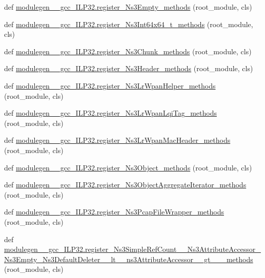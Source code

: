 \begin{DoxyCompactItemize}
\item 
def \hyperlink{namespacemodulegen____gcc__ILP32_aaaf5b4399b80410455abaa6263f1cd29}{modulegen\+\_\+\+\_\+gcc\+\_\+\+I\+L\+P32.\+register\+\_\+\+Ns3\+Empty\+\_\+methods} (root\+\_\+module, cls)
\item 
def \hyperlink{namespacemodulegen____gcc__ILP32_a162a098f5d929c52ad2e6c3ed1f54204}{modulegen\+\_\+\+\_\+gcc\+\_\+\+I\+L\+P32.\+register\+\_\+\+Ns3\+Int64x64\+\_\+t\+\_\+methods} (root\+\_\+module, cls)
\item 
def \hyperlink{namespacemodulegen____gcc__ILP32_acca0b09c03a65420f803907cd64df814}{modulegen\+\_\+\+\_\+gcc\+\_\+\+I\+L\+P32.\+register\+\_\+\+Ns3\+Chunk\+\_\+methods} (root\+\_\+module, cls)
\item 
def \hyperlink{namespacemodulegen____gcc__ILP32_aa49e4221854466e73c3442d993373495}{modulegen\+\_\+\+\_\+gcc\+\_\+\+I\+L\+P32.\+register\+\_\+\+Ns3\+Header\+\_\+methods} (root\+\_\+module, cls)
\item 
def \hyperlink{namespacemodulegen____gcc__ILP32_a968da64f4bbe9e3f6e46dfaf0edb7259}{modulegen\+\_\+\+\_\+gcc\+\_\+\+I\+L\+P32.\+register\+\_\+\+Ns3\+Lr\+Wpan\+Helper\+\_\+methods} (root\+\_\+module, cls)
\item 
def \hyperlink{namespacemodulegen____gcc__ILP32_a88bec2800cc13c4d4bd8350906877130}{modulegen\+\_\+\+\_\+gcc\+\_\+\+I\+L\+P32.\+register\+\_\+\+Ns3\+Lr\+Wpan\+Lqi\+Tag\+\_\+methods} (root\+\_\+module, cls)
\item 
def \hyperlink{namespacemodulegen____gcc__ILP32_afeb1bb2d6e21d4277bfd11481358454f}{modulegen\+\_\+\+\_\+gcc\+\_\+\+I\+L\+P32.\+register\+\_\+\+Ns3\+Lr\+Wpan\+Mac\+Header\+\_\+methods} (root\+\_\+module, cls)
\item 
def \hyperlink{namespacemodulegen____gcc__ILP32_a214a6e153873bc8ca6880fc3f4cb4cb0}{modulegen\+\_\+\+\_\+gcc\+\_\+\+I\+L\+P32.\+register\+\_\+\+Ns3\+Object\+\_\+methods} (root\+\_\+module, cls)
\item 
def \hyperlink{namespacemodulegen____gcc__ILP32_aa803b137018709bb9ce4e0561d4ce0c7}{modulegen\+\_\+\+\_\+gcc\+\_\+\+I\+L\+P32.\+register\+\_\+\+Ns3\+Object\+Aggregate\+Iterator\+\_\+methods} (root\+\_\+module, cls)
\item 
def \hyperlink{namespacemodulegen____gcc__ILP32_a098ccd45f3d1d9022ed87c5c0f7d7099}{modulegen\+\_\+\+\_\+gcc\+\_\+\+I\+L\+P32.\+register\+\_\+\+Ns3\+Pcap\+File\+Wrapper\+\_\+methods} (root\+\_\+module, cls)
\item 
def \hyperlink{namespacemodulegen____gcc__ILP32_ac3ab36c44430c9b0f0301233bd18935b}{modulegen\+\_\+\+\_\+gcc\+\_\+\+I\+L\+P32.\+register\+\_\+\+Ns3\+Simple\+Ref\+Count\+\_\+\+\_\+\+Ns3\+Attribute\+Accessor\+\_\+\+Ns3\+Empty\+\_\+\+Ns3\+Default\+Deleter\+\_\+\+\_\+lt\+\_\+\+\_\+ns3\+Attribute\+Accessor\+\_\+\+\_\+gt\+\_\+\+\_\+\+\_\+methods} (root\+\_\+module, cls)

\end{DoxyCompactItemize}
